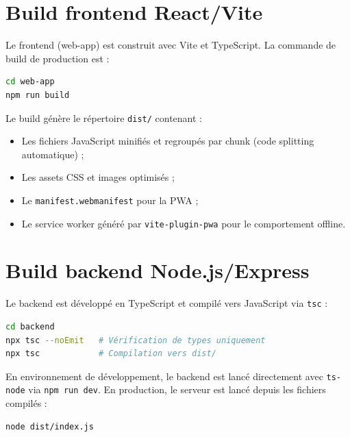 \section{Build frontend React/Vite}
\label{sec:build_frontend}

Le frontend (web-app) est construit avec Vite et TypeScript. La commande de build de production est :

\begin{lstlisting}[language=bash, caption={Build de production — Frontend React/Vite}]
cd web-app
npm run build
\end{lstlisting}

Le build génère le répertoire \texttt{dist/} contenant :
\begin{itemize}
  \item Les fichiers JavaScript minifiés et regroupés par chunk (code splitting automatique) ;
  \item Les assets CSS et images optimisés ;
  \item Le \texttt{manifest.webmanifest} pour la PWA ;
  \item Le service worker généré par \texttt{vite-plugin-pwa} pour le comportement offline.
\end{itemize}


\section{Build backend Node.js/Express}
\label{sec:build_backend}

Le backend est développé en TypeScript et compilé vers JavaScript via \texttt{tsc} :

\begin{lstlisting}[language=bash, caption={Compilation TypeScript — Backend Express}]
cd backend
npx tsc --noEmit   # Vérification de types uniquement
npx tsc            # Compilation vers dist/
\end{lstlisting}

En environnement de développement, le backend est lancé directement avec \texttt{ts-node} via \texttt{npm run dev}. En production, le serveur est lancé depuis les fichiers compilés :

\begin{lstlisting}[language=bash, caption={Démarrage du backend en production}]
node dist/index.js
\end{lstlisting}

